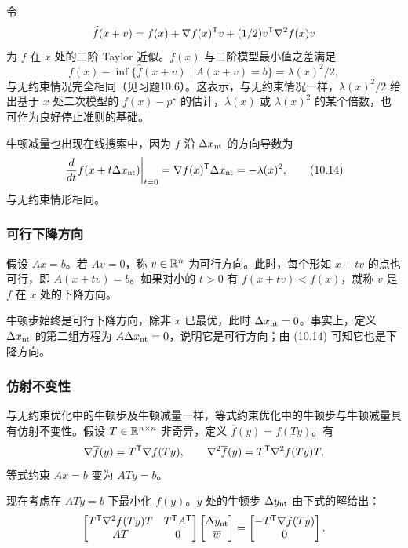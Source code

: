 令
\[\widehat f(x+v)=f(x)+\nabla f(x)^\mathsf T v+(1/2)v^\mathsf T\nabla^2f(x)v\]
为 $f$ 在 $x$ 处的二阶 Taylor 近似。$f(x)$ 与二阶模型最小值之差满足
\begin{equation}f(x)-\inf\{\widehat f(x+v)\mid A(x+v)=b\}=\lambda(x)^2/2,\tag{10.13}\end{equation}
与无约束情况完全相同（见习题10.6）。这表示，与无约束情况一样，$\lambda(x)^2/2$ 给出基于 $x$ 处二次模型的 $f(x)-p^\star$ 的估计，$\lambda(x)$ 或 $\lambda(x)^2$ 的某个倍数，也可作为良好停止准则的基础。

牛顿减量也出现在线搜索中，因为 $f$ 沿 $\Delta x_{\rm nt}$ 的方向导数为
\begin{equation}\left.\frac{d}{dt}f(x+t\Delta x_{\rm nt})\right|_{t=0}=\nabla f(x)^\mathsf T\Delta x_{\rm nt}=-\lambda(x)^2,\tag{10.14}\end{equation}
与无约束情形相同。

\subsubsection*{可行下降方向}
假设 $Ax=b$。若 $Av=0$，称 $v\in\mathbb R^n$ 为可行方向。此时，每个形如 $x+tv$ 的点也可行，即 $A(x+tv)=b$。如果对小的 $t>0$ 有 $f(x+tv)<f(x)$，就称 $v$ 是 $f$ 在 $x$ 处的下降方向。

牛顿步始终是可行下降方向，除非 $x$ 已最优，此时 $\Delta x_{\rm nt}=0$。事实上，定义 $\Delta x_{\rm nt}$ 的第二组方程为 $A\Delta x_{\rm nt}=0$，说明它是可行方向；由 (10.14) 可知它也是下降方向。

\subsubsection*{仿射不变性}
与无约束优化中的牛顿步及牛顿减量一样，等式约束优化中的牛顿步与牛顿减量具有仿射不变性。假设 $T\in\mathbb R^{n\times n}$ 非奇异，定义 $\overline f(y)=f(Ty)$。有
\[\nabla\overline f(y)=T^\mathsf T\nabla f(Ty),\qquad\nabla^2\overline f(y)=T^\mathsf T\nabla^2f(Ty)T,\]
等式约束 $Ax=b$ 变为 $ATy=b$。

现在考虑在 $ATy=b$ 下最小化 $\overline f(y)$。$y$ 处的牛顿步 $\Delta y_{\rm nt}$ 由下式的解给出：
\[\begin{bmatrix}T^\mathsf T\nabla^2f(Ty)T&T^\mathsf T A^\mathsf T\\AT&0\end{bmatrix}\begin{bmatrix}\Delta y_{\rm nt}\\\overline w\end{bmatrix}=\begin{bmatrix}-T^\mathsf T\nabla f(Ty)\\0\end{bmatrix}.\]

